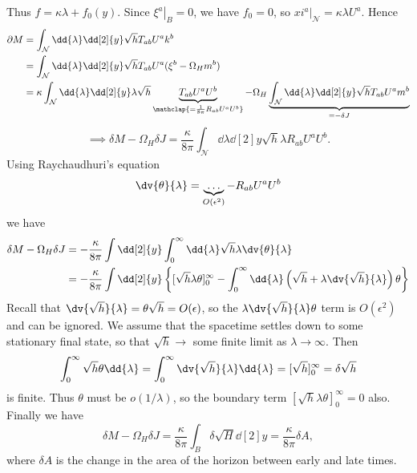 \documentclass{jknotes}
\begin{document}
Thus \(f=\kappa\lambda + f_0(y)\). Since \(\left.\xi^a\right|_B=0\), we have \(f_0=0\), so \(\left.xi^a\right|_{\mathcal{N}}=\kappa\lambda U^a\). Hence
\begin{align}
    \partial M &= \int_{\mathcal{N}} \dd{\lambda}\dd[2]{y}\sqrt{h}T_{ab}U^ak^b \\
               &= \int_{\mathcal{N}} \dd{\lambda}\dd[2]{y}\sqrt{h}T_{ab}U^a(\xi^b-\Omega_H m^b) \\
               &= 
    \kappa\int_{\mathcal{N}} \dd{\lambda}\dd[2]{y}\lambda\sqrt{h}\underbrace{T_{ab}U^aU^b}_{\mathclap{=\frac{1}{8\pi}R_{ab}U^aU^b}}
    - \Omega_H\underbrace{\int_{\mathcal{N}} \dd{\lambda}\dd[2]{y}\sqrt{h}T_{ab}U^a m^b}_{=-\delta J}
\end{align}
\begin{equation}
    \implies \delta M - \Omega_H \delta J = \frac{\kappa}{8\pi} \int_{\mathcal{N}}\dd{\lambda}\dd[2]{y}\sqrt{h}\lambda R_{ab}U^aU^b.
\end{equation}
Using Raychaudhuri's equation
\begin{equation}
    \dv{\theta}{\lambda} = \underbrace{\dots}_{O(\epsilon^2)} - R_{ab}U^aU^b
\end{equation}
we have
\begin{align}
    \delta M-\Omega_H\delta J &= - \frac{\kappa}{8\pi} \int\dd[2]{y}\int_0^\infty\dd{\lambda}\sqrt{h}\lambda\dv{\theta}{\lambda}\\
                              &= - \frac{\kappa}{8\pi} \int\dd[2]{y}\left\{ [\sqrt{h}\lambda\theta]^\infty_0 - \int^\infty_0\dd{\lambda}\left(\sqrt{h}+\lambda\dv{\sqrt{h}}{\lambda}\right)\theta\right\}
\end{align}
Recall that \(\dv{\sqrt{h}}{\lambda} = \theta\sqrt{h} = O(\epsilon)\), so the \(\lambda \dv{\sqrt{h}}{\lambda}\theta\) term is \(O(\epsilon^2)\) and can be ignored. We assume that the spacetime settles down to some stationary final state, so that \(\sqrt{h}\to\) some finite limit as \(\lambda \to \infty\). Then 
\begin{equation}
    \int^\infty_0\sqrt{h}\theta\dd{\lambda} = \int_0^\infty \dv{\sqrt{h}}{\lambda} \dd{\lambda} = [\sqrt{h}]_0^\infty = \delta\sqrt{h}
\end{equation}
is finite. Thus \(\theta\) must be \(o(1/\lambda)\), so the boundary term \([\sqrt{h}\lambda\theta]^\infty_0=0\) also. Finally we have
\begin{equation}
    \delta M - \Omega_H \delta J = \frac{\kappa}{8\pi}\int_B\delta\sqrt{H}\dd[2]{y} = \frac{\kappa}{8\pi} \delta A,
\end{equation}
where \(\delta A\) is the change in the area of the horizon between early and late times.
\end{document}

